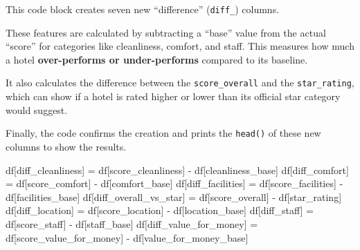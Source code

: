\documentclass[
  letterpaper,
  DIV=11,
  numbers=noendperiod]{scrartcl}
\newenvironment{Shaded}{\begin{snugshade}}{\end{snugshade}}
\newcommand{\NormalTok}[1]{\textcolor[rgb]{0.00,0.23,0.31}{#1}}
\newcommand{\OperatorTok}[1]{\textcolor[rgb]{0.37,0.37,0.37}{#1}}
\newcommand{\StringTok}[1]{\textcolor[rgb]{0.13,0.47,0.30}{#1}}
\begin{document}
This code block creates seven new ``difference'' (\texttt{diff\_})
columns.

These features are calculated by subtracting a ``base'' value from the
actual ``score'' for categories like cleanliness, comfort, and staff.
This measures how much a hotel \textbf{over-performs or under-performs}
compared to its baseline.

It also calculates the difference between the \texttt{score\_overall}
and the \texttt{star\_rating}, which can show if a hotel is rated higher
or lower than its official star category would suggest.

Finally, the code confirms the creation and prints the \texttt{head()}
of these new columns to show the results.

\begin{Shaded}
\begin{Highlighting}[]

\NormalTok{df[}\StringTok{\textquotesingle{}diff\_cleanliness\textquotesingle{}}\NormalTok{] }\OperatorTok{=}\NormalTok{ df[}\StringTok{\textquotesingle{}score\_cleanliness\textquotesingle{}}\NormalTok{] }\OperatorTok{{-}}\NormalTok{ df[}\StringTok{\textquotesingle{}cleanliness\_base\textquotesingle{}}\NormalTok{]}
\NormalTok{df[}\StringTok{\textquotesingle{}diff\_comfort\textquotesingle{}}\NormalTok{] }\OperatorTok{=}\NormalTok{ df[}\StringTok{\textquotesingle{}score\_comfort\textquotesingle{}}\NormalTok{] }\OperatorTok{{-}}\NormalTok{ df[}\StringTok{\textquotesingle{}comfort\_base\textquotesingle{}}\NormalTok{]}
\NormalTok{df[}\StringTok{\textquotesingle{}diff\_facilities\textquotesingle{}}\NormalTok{] }\OperatorTok{=}\NormalTok{ df[}\StringTok{\textquotesingle{}score\_facilities\textquotesingle{}}\NormalTok{] }\OperatorTok{{-}}\NormalTok{ df[}\StringTok{\textquotesingle{}facilities\_base\textquotesingle{}}\NormalTok{]}
\NormalTok{df[}\StringTok{\textquotesingle{}diff\_overall\_vs\_star\textquotesingle{}}\NormalTok{] }\OperatorTok{=}\NormalTok{ df[}\StringTok{\textquotesingle{}score\_overall\textquotesingle{}}\NormalTok{] }\OperatorTok{{-}}\NormalTok{ df[}\StringTok{\textquotesingle{}star\_rating\textquotesingle{}}\NormalTok{]}
\NormalTok{df[}\StringTok{\textquotesingle{}diff\_location\textquotesingle{}}\NormalTok{] }\OperatorTok{=}\NormalTok{ df[}\StringTok{\textquotesingle{}score\_location\textquotesingle{}}\NormalTok{] }\OperatorTok{{-}}\NormalTok{ df[}\StringTok{\textquotesingle{}location\_base\textquotesingle{}}\NormalTok{]}
\NormalTok{df[}\StringTok{\textquotesingle{}diff\_staff\textquotesingle{}}\NormalTok{] }\OperatorTok{=}\NormalTok{ df[}\StringTok{\textquotesingle{}score\_staff\textquotesingle{}}\NormalTok{] }\OperatorTok{{-}}\NormalTok{ df[}\StringTok{\textquotesingle{}staff\_base\textquotesingle{}}\NormalTok{]}
\NormalTok{df[}\StringTok{\textquotesingle{}diff\_value\_for\_money\textquotesingle{}}\NormalTok{] }\OperatorTok{=}\NormalTok{ df[}\StringTok{\textquotesingle{}score\_value\_for\_money\textquotesingle{}}\NormalTok{] }\OperatorTok{{-}}\NormalTok{ df[}\StringTok{\textquotesingle{}value\_for\_money\_base\textquotesingle{}}\NormalTok{]}


\end{Highlighting}
\end{Shaded}
\end{document}
